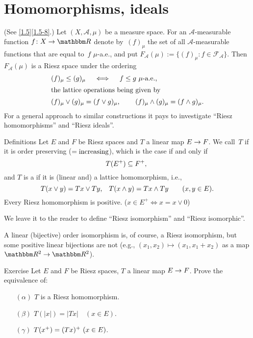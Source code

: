 \documentclass[main.tex]{subfiles}
\begin{document}
\section{Homomorphisms, ideals}
%
%
\begin{psec}{2.1}%
(See \ref{1.5}\ref{1.5-8}.) 
Let $(X,\mathcal A, \mu)$ be a measure space.
For an $\mathcal A$-measurable 
function $f\colon X\ra \R$
denote by~$(f)_\mu$
the set of all $\mathcal A$-measurable functions
that are equal to~$f$ $\mu$-a.e.,
and put 
$F_{\mathcal A}(\mu):=\{(f)_\mu\colon f\in\mathcal{F}_{\mathcal A}\}$.
Then~$F_{\mathcal A}(\mu)$ 
is a Riesz space
under the ordering
\begin{align*}
& (f)_\mu \leq (g)_\mu \quad \iff \quad f\leq g\ \mu\htam{-a.e.,} \\
\intertext{%
the lattice operations being given by}%
& (f)_\mu \vee (g)_\mu = (f\vee g)_\mu \htam{, }
  \qquad (f)_\mu \wedge (g)_\mu = (f\wedge g)_\mu
\htam{.}
\end{align*}
For a general approach to similar constructions
it pays to investigate ``Riesz homomorphisms'' 
and ``Riesz ideals''.
\end{psec}
%
%
\begin{psec}{2.2}{Definitions}
Let $E$ and $F$ be Riesz spaces 
and $T$ a linear map $E\rightarrow F$.
We call~$T$  
if it is order preserving ($=\text{increasing}$),
which is the case if and only if
\begin{equation*}
T(E^+) \subseteq F^+\text{, }
\end{equation*}
and $T$ is a  if
it is (linear and) a 
lattice homomorphism, i.e.,
\begin{equation*}
T(x\vee y) = Tx \vee Ty\text{,}
\quad T(x\wedge y)=Tx\wedge Ty
\qquad (x,y\in E)\text{.}
\end{equation*}
Every Riesz homomorphism is positive. 
($x\in E^+\iff x=x\vee 0$)

We leave it to the reader to define ``Riesz isomorphism''
and ``Riesz isomorphic''.

A linear (bijective) order isomorphism is,
of course,
a Riesz isomorphism,
but some positive linear bijections are not
(e.g., $(x_1,x_2)\mapsto(x_1,x_1+x_2)$ as a map
$\R^2\ra\R^2$).
\end{psec}
%
%
\begin{psec}{2.3}{Exercise}
Let $E$ and $F$ be Riesz spaces,
$T$ a linear map $E\rightarrow F$.
Prove the equivalence of:
\begin{enumerate}
\item[$(\alpha)$]  \label{2.3-alpha}
$T$ is a Riesz homomorphism.
%
\item[$(\beta)$]  \label{2.3-beta}
$T(|x|)=|Tx| \quad (x\in E)$.
%
\item[$(\gamma)$]  \label{2.3-gamma}
$T(x^+) = \lsub{(Tx)^+}{(Tx)} \quad (x\in E)$.
\end{enumerate}
\end{psec}
\end{document}
